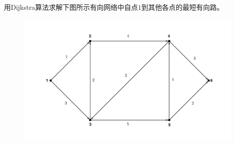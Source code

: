 \documentclass[lang = cn, scheme = chinese, thmcnt = section]{elegantbook}
\begin{document}
\begin{example}
	用Dijkstra算法求解下图所示有向网络中自点$1$到其他各点的最短有向路。
	\begin{figure}[H]
		\centering
		\includegraphics[scale = 0.15]{../图/13.1.1}
	\end{figure}
\end{example}
\end{document}
